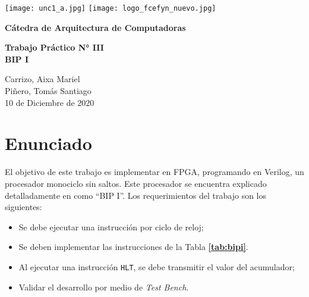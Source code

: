 \documentclass[12pt,a4paper]{article}
\renewcommand{\baselinestretch}{1} %
\begin{document}
\begin{titlepage}
    \begin{center}
      \vspace*{1cm}

      \vspace{2cm}
      \texttt{[image: unc1\_a.jpg]}
      \texttt{[image: logo\_fcefyn\_nuevo.jpg]}

      \Huge
      \textbf{Cátedra de Arquitectura de Computadoras}

      \vspace{3.5cm}

      \textbf{Trabajo Práctico N\si{\degree} III}\\
      \textbf{BIP I}

      \vfill

      \vspace{0.8cm}



      \Large
      Carrizo, Aixa Mariel\\
      Piñero, Tomás Santiago\\      
      10 de Diciembre de 2020
    \end{center}
\end{titlepage}

\setcounter{secnumdepth}{4}
\setcounter{tocdepth}{5}
\tableofcontents


\newpage
\renewcommand{\baselinestretch}{1}
\setlength{\parskip}{0.5em}


\newpage
\section{Enunciado}
\label{sec:enun}

El objetivo de este trabajo es implementar en FPGA, programando en Verilog, un procesador monociclo sin saltos. Este procesador se encuentra explicado detalladamente en \cite{bip} como ``BIP I''. 
Los requerimientos del trabajo son los siguientes:

\begin{itemize}[leftmargin=1.5cm, itemsep=1pt]
\item Se debe ejecutar una instrucción por ciclo de reloj;
\item Se deben implementar las instrucciones de la Tabla \textbf{\ref{tab:bipi}}.
\item Al ejecutar una instrucción \verb|HLT|, se debe transmitir el valor del
acumulador;
\item Validar el desarrollo por medio de \emph{Test Bench}.	
\end{itemize}
\end{document}
